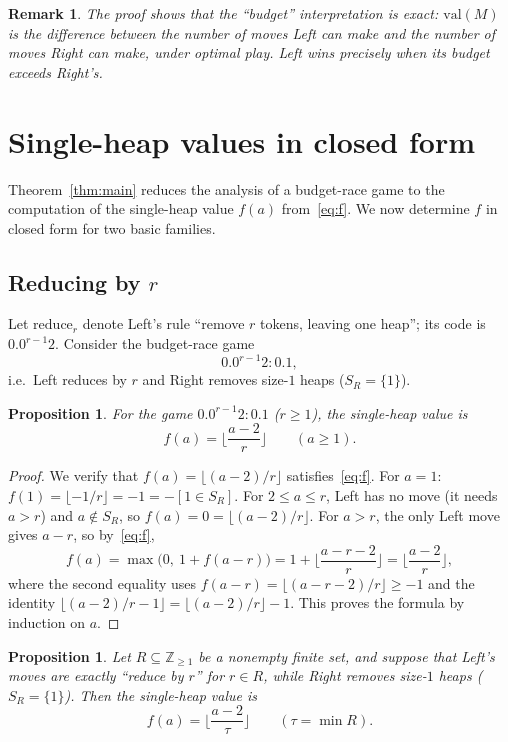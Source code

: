\documentclass[11pt]{article}
\newtheorem{proposition}[theorem]{Proposition}
\newtheorem{remark}[theorem]{Remark}
\newcommand{\val}{\ensuremath{\mathrm{val}}}
\begin{document}
\begin{remark}
The proof shows that the ``budget'' interpretation is exact: $\val(M)$ is the difference
between the number of moves Left can make and the number of moves Right can make, under
optimal play. Left wins precisely when its budget exceeds Right's.
\end{remark}

\section{Single-heap values in closed form}\label{sec:values}

Theorem~\ref{thm:main} reduces the analysis of a budget-race game to the computation of the
single-heap value $f(a)$ from~\eqref{eq:f}. We now determine $f$ in closed form for two basic
families.

\subsection{Reducing by $r$}

Let $\mathrm{reduce}_r$ denote Left's rule ``remove $r$ tokens, leaving one heap''; its code
is $0.0^{r-1}2$. Consider the budget-race game
\[
0.0^{r-1}2:0.1,
\]
i.e.\ Left reduces by $r$ and Right removes size-$1$ heaps ($S_R=\{1\}$).

\begin{proposition}\label{prop:reduce}
For the game $0.0^{r-1}2:0.1$ ($r\ge1$), the single-heap value is
\[
f(a)=\Big\lfloor\frac{a-2}{r}\Big\rfloor\qquad(a\ge1).
\]
\end{proposition}

\begin{proof}
We verify that $f(a)=\lfloor(a-2)/r\rfloor$ satisfies~\eqref{eq:f}. For $a=1$:
$f(1)=\lfloor-1/r\rfloor=-1=-[1\in S_R]$. For $2\le a\le r$, Left has no move (it needs
$a>r$) and $a\notin S_R$, so $f(a)=0=\lfloor(a-2)/r\rfloor$. For $a>r$, the only Left move
gives $a-r$, so by~\eqref{eq:f},
\[
f(a)=\max\bigl(0,\ 1+f(a-r)\bigr)
=1+\Big\lfloor\frac{a-r-2}{r}\Big\rfloor
=\Big\lfloor\frac{a-2}{r}\Big\rfloor,
\]
where the second equality uses $f(a-r)=\lfloor(a-r-2)/r\rfloor\ge -1$ and the identity
$\lfloor (a-2)/r - 1\rfloor = \lfloor (a-2)/r\rfloor -1$. This proves the formula by
induction on $a$.
\end{proof}

\begin{proposition}\label{prop:reduce-multi}
Let $R\subseteq\mathbb{Z}_{\ge1}$ be a nonempty finite set, and suppose that Left's moves are
exactly ``reduce by $r$'' for $r\in R$, while Right removes size-$1$ heaps ($S_R=\{1\}$). Then
the single-heap value is
\[
f(a)=\Big\lfloor\frac{a-2}{\tau}\Big\rfloor\qquad(\tau=\min R).
\]
\end{proposition}
\end{document}
